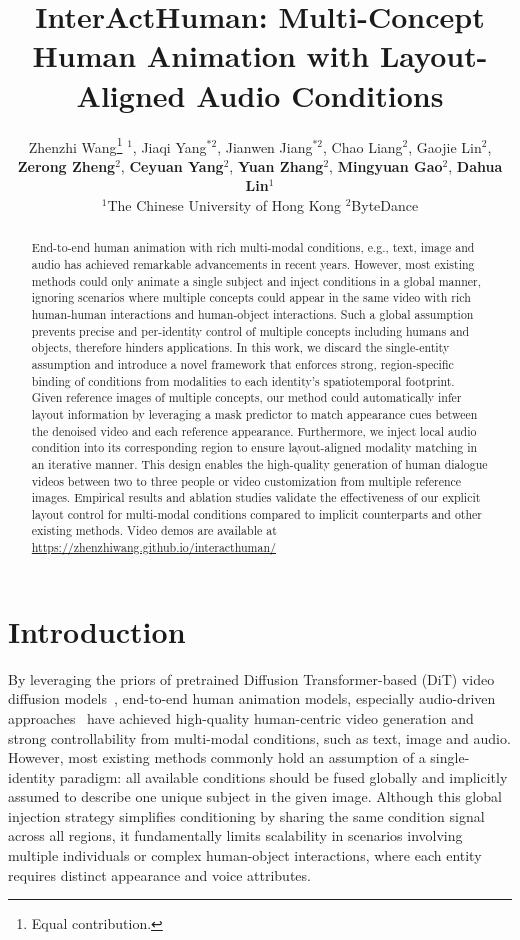 \documentclass{article} %
\title{InterActHuman: Multi-Concept Human Animation with Layout-Aligned Audio Conditions}
\author{Zhenzhi Wang\thanks{Equal contribution.} $^1$, Jiaqi Yang$^{*2}$, Jianwen Jiang$^{*2}$\textsuperscript{\Letter}, Chao Liang$^2$, Gaojie Lin$^2$,\\  \textbf{Zerong Zheng}$^2$, \textbf{Ceyuan Yang}$^2$, \textbf{Yuan Zhang}$^2$, \textbf{Mingyuan Gao}$^2$, \textbf{Dahua Lin}$^1$ \\
$^1$The Chinese University of Hong Kong \quad $^2$ByteDance \\
}
\begin{document}
\maketitle

\begin{abstract}
End-to-end human animation with rich multi-modal conditions, e.g., text, image and audio has achieved remarkable advancements in recent years. However, most existing methods could only animate a single subject and inject conditions in a global manner, ignoring scenarios where multiple concepts could appear in the same video with rich human-human interactions and human-object interactions. Such a global assumption prevents precise and per-identity control of multiple concepts including humans and objects, therefore hinders applications. In this work, we discard the single-entity assumption and introduce a novel framework that enforces strong, region‑specific binding of conditions from modalities to each identity's spatiotemporal footprint. Given reference images of multiple concepts, our method could automatically infer layout information by leveraging a mask predictor to match appearance cues between the denoised video and each reference appearance. Furthermore, we inject local audio condition into its corresponding region to ensure layout-aligned modality matching in an iterative manner. This design enables the high-quality generation of human dialogue videos between two to three people or video customization from multiple reference images. Empirical results and ablation studies validate the effectiveness of our explicit layout control for multi-modal conditions compared to implicit counterparts and other existing methods. Video demos are available at \url{https://zhenzhiwang.github.io/interacthuman/}
\end{abstract}

\section{Introduction}
By leveraging the priors of pretrained Diffusion Transformer-based (DiT) video diffusion models~\citep{bar2024lumiere,svd,ayl,guo2024animatediff,zhou2022magicvideo,walt,wang2023modelscope,vdm,videogan,cvideogan,singer2022make,text2video,villegas2022phenaki,lin2025apt}, end-to-end human animation models, especially audio-driven approaches~\citep{he2023gaia,emo,xu2024hallo,wang2024vexpress,chen2024echomimic,xu2024vasa,stypulkowski2024diffused,jiang2024loopy,lin2024cyberhost,lin2025omnihuman} have achieved high-quality human-centric video generation and strong controllability from multi-modal conditions, such as text, image and audio. However, most existing methods commonly hold an assumption of a single-identity paradigm: all available conditions should be fused globally and implicitly assumed to describe one unique subject in the given image. Although this global injection strategy simplifies conditioning by sharing the same condition signal across all regions, it fundamentally limits scalability in scenarios involving multiple individuals or complex human-object interactions, where each entity requires distinct appearance and voice attributes.
\end{document}
